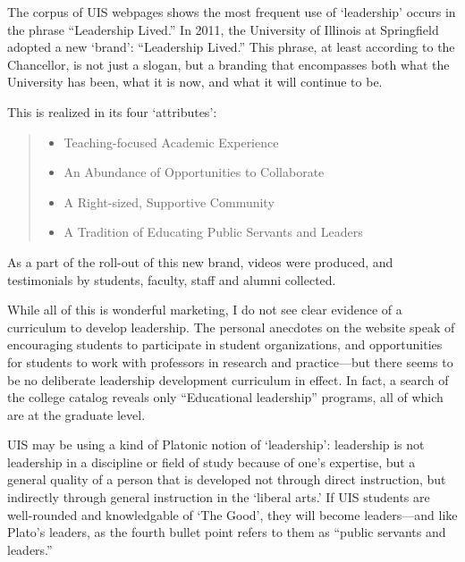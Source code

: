 The corpus of UIS webpages shows the most frequent use of `leadership' occurs in the phrase ``Leadership Lived.'' In 2011, the University of Illinois at Springfield adopted a new `brand': ``Leadership Lived.'' This phrase, at least according to the Chancellor, is not just a slogan, but a branding that encompasses both what the University has been, what it is now, and what it will continue to be.

This is realized in its four `attributes':

\begin{quote}

\begin{itemize}
\item Teaching-focused Academic Experience

\item An Abundance of Opportunities to Collaborate

\item A Right-sized, Supportive Community

\item A Tradition of Educating Public Servants and Leaders 

\end{itemize}
\end{quote}

As a part of the roll-out of this new brand, videos were produced, and testimonials by students, faculty, staff and alumni collected. 

While all of this is wonderful marketing, I do not see clear evidence of a curriculum to develop leadership. The personal anecdotes on the website speak of encouraging students to participate in student organizations, and opportunities for students to work with professors in research and practice---but there seems to be no deliberate leadership development curriculum in effect. In fact, a search of the college catalog reveals only ``Educational leadership'' programs, all of which are at the graduate level.

UIS may be using a kind of Platonic notion of `leadership': leadership is not leadership in a discipline or field of study because of one's expertise, but a general quality of a person that is developed not through direct instruction, but indirectly through general instruction in the `liberal arts.' If UIS students are well-rounded and knowledgable of `The Good', they will become leaders---and like Plato's leaders, as the fourth bullet point refers to them as ``public servants and leaders.''

